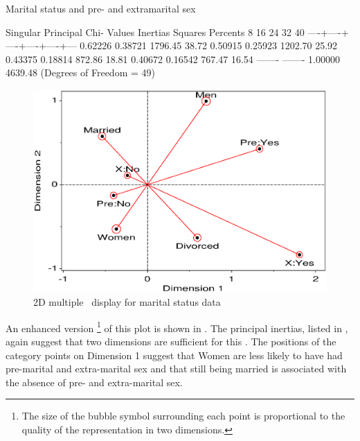 \begin{Example}[marital3]{Marital status and pre- and extramarital sex}
\begin{Output}[htb]
\begin{output}
        Singular  Principal Chi-                                        
        Values    Inertias  Squares Percents    8   16   24   32   40   
                                            ----+----+----+----+----+---
        0.62226   0.38721   1796.45  38.72%
        0.50915   0.25923   1202.70  25.92%
        0.43375   0.18814    872.86  18.81%
        0.40672   0.16542    767.47  16.54%
                  -------   -------                                     
                  1.00000   4639.48 (Degrees of Freedom = 49)           
\end{output}
\end{Output}
\begin{figure}[htb]
  \centering
  \includegraphics[scale=.8,clip]{ch5/fig/mcamarital1}
  \caption{2D multiple \CA\ display for marital status data}%
  \label{fig:mcamarital1}
\end{figure}

An enhanced version%
\footnote{The size of the bubble symbol surrounding each point is proportional
to the quality of the representation in two dimensions.}
of this plot is shown in .
The principal inertias, listed in , again suggest
that two dimensions are sufficient for this \Dset.
The positions of the category points on Dimension 1 suggest that Women
are less likely to have had pre-marital and extra-marital sex
and that still being married is associated with the absence of pre- and extra-marital sex.


\end{Example}
